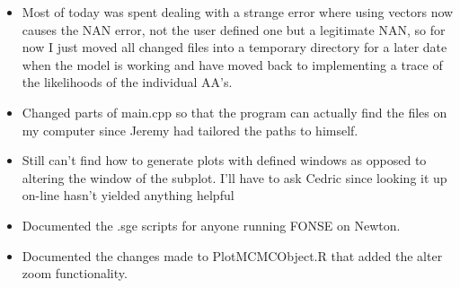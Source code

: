 \documentclass[11pt]{labbook}
\begin{document}
    \begin{itemize}
        \item Most of today was spent dealing with a strange error where using vectors now causes the NAN error, not the user defined one but a legitimate NAN, so for now I just moved all changed files into a temporary directory for a later date when the model is working and have moved back to implementing a trace of the likelihoods of the individual AA's.
        \item Changed parts of main.cpp so that the program can actually find the files on my computer since Jeremy had tailored the paths to himself.
        \item Still can't find how to generate plots with defined windows as opposed to altering the window of the subplot. I'll have to ask Cedric since looking it up on-line hasn't yielded anything helpful
        \item Documented the .sge scripts for anyone running FONSE on Newton.
        \item Documented the changes made to PlotMCMCObject.R that added the alter zoom functionality.
    \end{itemize}
\end{document}
